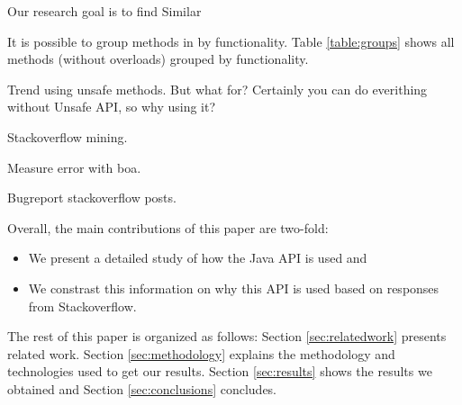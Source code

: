 Our research goal is to find 
Similar \cite{Dyer-Rajan-Nguyen-Nguyen-14}



It is possible to group methods in \smu{} by functionality.
Table \ref{table:groups} shows all methods (without overloads) grouped by functionality.




Trend using unsafe methods. But what for? Certainly you can do everithing without Unsafe API, so why using it? 

 

Stackoverflow mining.

Measure error with boa.


Bugreport stackoverflow posts.


Overall, the main contributions of this paper are two-fold:
\begin{itemize}
\item We present a detailed study of how the Java \smu{} API is used and
\item We constrast this information on why this API is used based on responses from Stackoverflow.
\end{itemize}

The rest of this paper is organized as follows:
Section \ref{sec:relatedwork} presents related work.
Section \ref{sec:methodology} explains the methodology and technologies used to get our results.
Section \ref{sec:results} shows the results we obtained and Section \ref{sec:conclusions} concludes.
